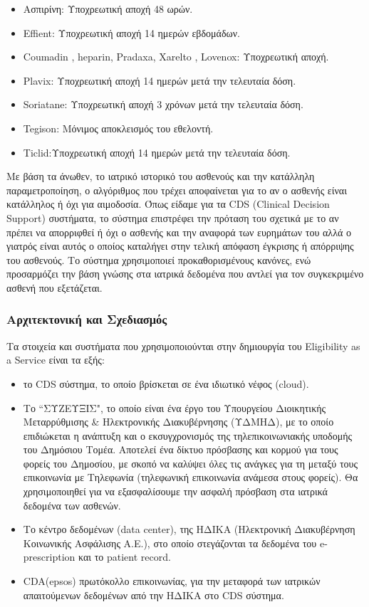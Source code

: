 \begin{itemize}
		\item Ασπιρίνη: Υποχρεωτική αποχή 48 ωρών.
		\item Effient: Υποχρεωτική αποχή 14 ημερών εβδομάδων.
		\item Coumadin , heparin, Pradaxa, Xarelto , Lovenox: Υποχρεωτική αποχή.
		\item Plavix: Υποχρεωτική αποχή 14 ημερών μετά την τελευταία δόση.
		\item Soriatane: Υποχρεωτική αποχή 3 χρόνων μετά την τελευταία δόση.
		\item Tegison: Μόνιμος αποκλεισμός του εθελοντή. 
		\item Ticlid:Υποχρεωτική αποχή 14 ημερών μετά την τελευταία δόση.
	

		\end{itemize}
		
		Με βάση τα άνωθεν, το ιατρικό ιστορικό του ασθενούς και την κατάλληλη παραμετροποίηση, ο αλγόριθμος που τρέχει αποφαίνεται για το αν ο ασθενής είναι κατάλληλος ή όχι για αιμοδοσία. Όπως είδαμε για τα CDS (Clinical Decision Support) συστήματα, το σύστημα επιστρέφει την πρόταση του σχετικά με το αν πρέπει να απορριφθεί ή όχι ο ασθενής και την αναφορά των ευρημάτων του αλλά ο γιατρός είναι αυτός ο οποίος καταλήγει στην τελική απόφαση έγκρισης ή απόρριψης του ασθενούς. Το σύστημα χρησιμοποιεί προκαθορισμένους κανόνες, ενώ προσαρμόζει την βάση γνώσης στα ιατρικά δεδομένα που αντλεί για τον συγκεκριμένο ασθενή που εξετάζεται.
	
		
	\subsubsection{Αρχιτεκτονική και Σχεδιασμός}
		
		Τα στοιχεία και συστήματα που χρησιμοποιούνται στην δημιουργία του Eligibility as a Service είναι τα εξής:
		
		\begin{itemize}
		
		\item το CDS σύστημα, το οποίο βρίσκεται σε ένα ιδιωτικό νέφος (cloud).

		\item Το ``ΣΥΖΕΥΞΙΣ", το οποίο είναι ένα έργο του Υπουργείου Διοικητικής Μεταρρύθμισης \& Ηλεκτρονικής Διακυβέρνησης (ΥΔΜΗΔ), με το οποίο επιδιώκεται η ανάπτυξη και ο εκσυγχρονισμός της τηλεπικοινωνιακής υποδομής του Δημόσιου Τομέα. Αποτελεί  ένα δίκτυο πρόσβασης και κορμού για τους φορείς του Δημοσίου, με σκοπό να καλύψει όλες τις ανάγκες για τη μεταξύ τους επικοινωνία με  Τηλεφωνία (τηλεφωνική επικοινωνία ανάμεσα στους φορείς). Θα χρησιμοποιηθεί για να εξασφαλίσουμε την ασφαλή πρόσβαση στα ιατρικά δεδομένα των ασθενών.
		
		\item Το κέντρο δεδομένων (data center), της ΗΔΙΚΑ (Ηλεκτρονική Διακυβέρνηση Κοινωνικής Ασφάλισης Α.Ε.), στο οποίο στεγάζονται τα δεδομένα του e-prescription και το patient record.
		

		\item CDA(epsos) πρωτόκολλο επικοινωνίας, για την μεταφορά των ιατρικών απαιτούμενων δεδομένων από την ΗΔΙΚΑ στο CDS σύστημα.
			
		\end{itemize}				
		
